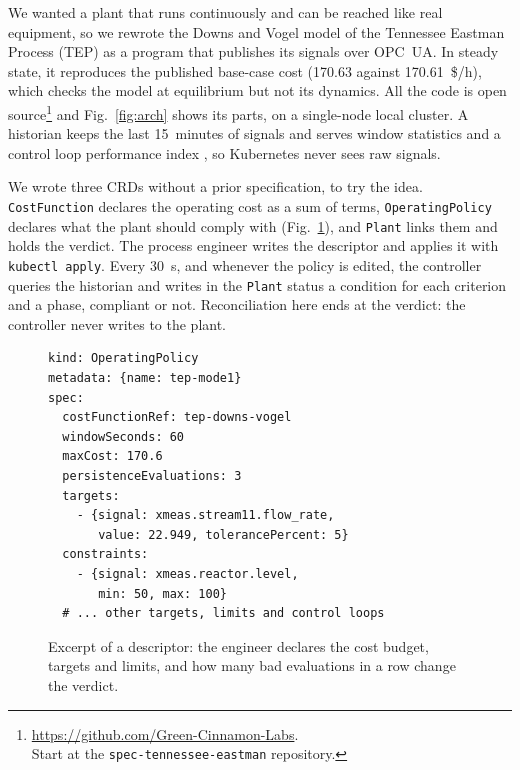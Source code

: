 \documentclass[conference]{IEEEtran}
\begin{document}
We wanted a plant that runs continuously and can be reached like real equipment, so we rewrote the Downs and Vogel model of the Tennessee Eastman Process (TEP) \cite{DOWNS1993} as a program that publishes its signals over OPC~UA. In steady state, it reproduces the published base-case cost (170.63 against 170.61~\$/h), which checks the model at equilibrium but not its dynamics. All the code is open source\footnote{\raggedright\url{https://github.com/Green-Cinnamon-Labs}.\\ Start at the \texttt{spec-tennessee-eastman} repository.} and Fig.~\ref{fig:arch} shows its parts, on a single-node local cluster. A historian keeps the last 15~minutes of signals and serves window statistics and a control loop performance index \cite{Bradu2018}, so Kubernetes never sees raw signals.

We wrote three CRDs without a prior specification, to try the idea. \texttt{CostFunction} declares the operating cost as a sum of terms, \texttt{OperatingPolicy} declares what the plant should comply with (Fig.~\ref{fig:desc}), and \texttt{Plant} links them and holds the verdict. The process engineer writes the descriptor and applies it with \texttt{kubectl apply}. Every 30~s, and whenever the policy is edited, the controller queries the historian and writes in the \texttt{Plant} status a condition for each criterion and a phase, compliant or not. Reconciliation here ends at the verdict: the controller never writes to the plant.

\begin{figure}[t]
\centering
\footnotesize
\begin{verbatim}
kind: OperatingPolicy
metadata: {name: tep-mode1}
spec:
  costFunctionRef: tep-downs-vogel
  windowSeconds: 60
  maxCost: 170.6
  persistenceEvaluations: 3
  targets:
    - {signal: xmeas.stream11.flow_rate,
       value: 22.949, tolerancePercent: 5}
  constraints:
    - {signal: xmeas.reactor.level,
       min: 50, max: 100}
  # ... other targets, limits and control loops
\end{verbatim}
\vspace{-2mm}
\caption{Excerpt of a descriptor: the engineer declares the cost budget, targets and limits, and how many bad evaluations in a row change the verdict.}
\label{fig:desc}
\end{figure}
\end{document}
